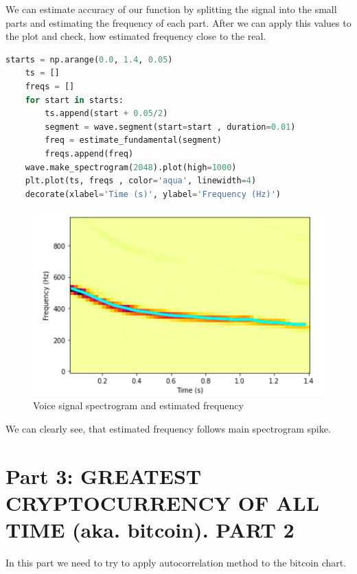 \documentclass[a4paper]{article}
\begin{document}
        We can estimate accuracy of our function by splitting the signal into the small parts and estimating the frequency of each part. After we can apply this values to the plot and check, how estimated frequency close to the real.
            
        \begin{lstlisting}[language=Python,caption={Estimation check code},label={lst:sawtooth_def}]
    starts = np.arange(0.0, 1.4, 0.05)
    ts = []
    freqs = []
    for start in starts:
        ts.append(start + 0.05/2)
        segment = wave.segment(start=start , duration=0.01)
        freq = estimate_fundamental(segment)
        freqs.append(freq)
    wave.make_spectrogram(2048).plot(high=1000)
    plt.plot(ts, freqs , color='aqua', linewidth=4)
    decorate(xlabel='Time (s)', ylabel='Frequency (Hz)')
        \end{lstlisting}
        
        \begin{figure}[H]
            \centering
            \includegraphics[width=\textwidth]{img/voice_freq.png}
            \caption{Voice signal spectrogram and estimated frequency}
            \label{fig:part1_1_2}
        \end{figure}
        
        We can clearly see, that estimated frequency follows main spectrogram spike.
        
    \newpage
        \section{Part 3: GREATEST CRYPTOCURRENCY OF ALL TIME (aka. bitcoin). PART 2}
            
        In this part we need to try to apply autocorrelation method to the bitcoin chart. 
        
\end{document}
